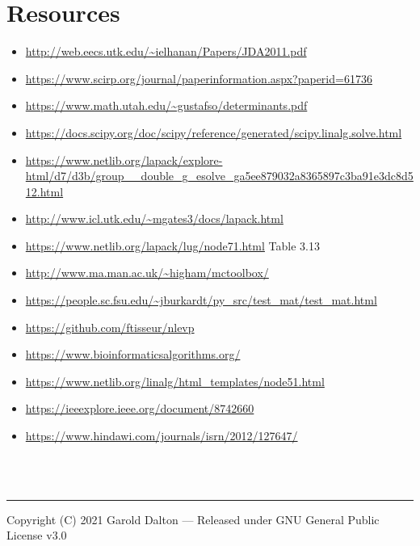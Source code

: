 \documentclass[12pt]{article}
\begin{document}
\section{Resources}
\begin{itemize}
	\item \url{http://web.eecs.utk.edu/~ielhanan/Papers/JDA2011.pdf}
	\item \url{https://www.scirp.org/journal/paperinformation.aspx?paperid=61736}
	\item \url{https://www.math.utah.edu/~gustafso/determinants.pdf}
	\item \url{https://docs.scipy.org/doc/scipy/reference/generated/scipy.linalg.solve.html}
	\item \url{https://www.netlib.org/lapack/explore-html/d7/d3b/group__double_g_esolve_ga5ee879032a8365897c3ba91e3dc8d512.html}
	\item \url{http://www.icl.utk.edu/~mgates3/docs/lapack.html}
	\item \url{https://www.netlib.org/lapack/lug/node71.html} Table 3.13
	\item \url{http://www.ma.man.ac.uk/~higham/mctoolbox/}
	\item \url{https://people.sc.fsu.edu/~jburkardt/py_src/test_mat/test_mat.html}
	\item \url{https://github.com/ftisseur/nlevp}
	\item \url{https://www.bioinformaticsalgorithms.org/}
	\item \url{https://www.netlib.org/linalg/html_templates/node51.html}
	\item \url{https://ieeexplore.ieee.org/document/8742660}
	\item \url{https://www.hindawi.com/journals/isrn/2012/127647/}
\end{itemize}

\begin{align*}
\end{align*}

\begin{align*}
\end{align*}

\begin{lstlisting}[language=Python]
\end{lstlisting}

\noindent\rule{\textwidth}{1pt}
{\footnotesize Copyright (C) 2021 Garold Dalton --- Released under GNU General Public License v3.0}

\cleardoublepage
\end{document}
